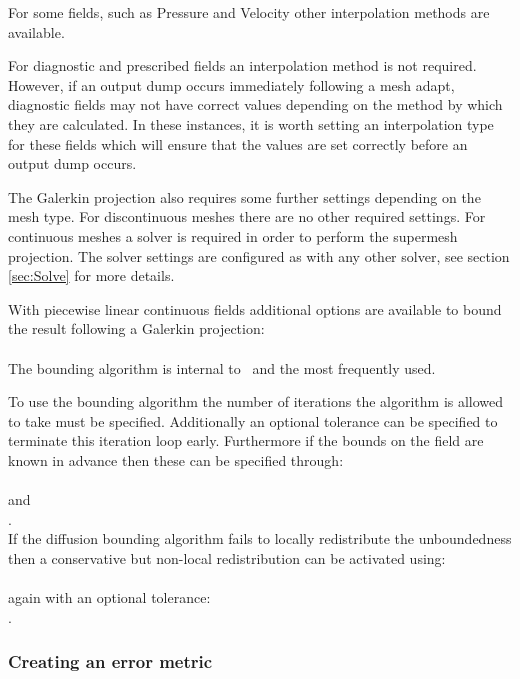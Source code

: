 For some fields, such as Pressure and Velocity other interpolation methods are available.

For diagnostic and prescribed fields an interpolation method is not required. However, if an output dump
occurs immediately following a mesh adapt, diagnostic fields may not have correct values depending
on the method by which they are calculated. In these instances, it is worth setting an interpolation type
for these fields which will ensure that the values are set correctly before an output dump occurs.

The Galerkin projection also requires some further settings depending on the mesh type. For discontinuous
meshes there are no other required settings.  For continuous meshes a solver is required in order
to perform the supermesh projection. The solver settings are configured as with any other solver, see
section \ref{sec:Solve} for more details.

With piecewise linear continuous fields additional options are available to bound the result following a Galerkin projection:\\
\\
The  bounding algorithm is internal to \fluidity\ and the most frequently used.

To use the  bounding algorithm \citep{farrell2009a} the number of iterations the algorithm is allowed to take must be specified.  Additionally an optional tolerance can be specified to terminate this iteration loop early.  Furthermore if the bounds on the field are known in advance then these can be specified through:\\
\\
and\\
.\\
If the diffusion bounding algorithm fails to locally redistribute the unboundedness then a conservative but non-local redistribution can be activated using:\\
\\
again with an optional tolerance:\\
.

\subsubsection{Creating an error metric}
\label{sec:configuring_fluidity_error_metric}

